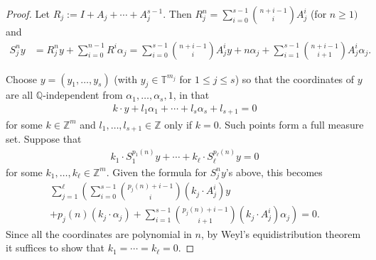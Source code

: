 \documentclass[10pt,a4paper]{amsart}
\newcommand{\Q}{{\mathbb Q}}
\newcommand{\T}{{\mathbb T}}
\newcommand{\Z}{{\mathbb Z}}
\newcommand{\brac}[1]{\mathopen{}\left( #1 \mathclose{}\right)}
\begin{document}
\begin{proof}
    Let $R_j:=I+ A_j + \cdots + A_j^{s-1}$. Then $R_j^n=\sum_{i=0}^{s-1}\binom{n+i-1}{i}A_j^i$ (for $n\geq 1)$ and 
    \begin{align*}
        S_j^n y &= R_j^n y + \sum_{i=0}^{n-1}R^i\alpha_j %
        = \sum_{i=0}^{s-1}\binom{n+i-1}{i}A_j^iy + n\alpha_j + \sum_{i=1}^{s-1}\binom{n+i-1}{i+1}A_j^i\alpha_j.
    \end{align*}
    

    Choose $y=(y_1, \ldots, y_s)$ (with $y_{j}\in\T^{m_{j}}$ for $1\leq j\leq s$) so that the coordinates of $y$ are all $\Q$-independent from $\alpha_1, \ldots, \alpha_s, 1$, in that
    \begin{align*}
        k\cdot y + l_1 \alpha_1 + \cdots + l_s \alpha_s + l_{s+1} = 0
    \end{align*}
    for some $k\in\Z^m$ and $l_1, \ldots, l_{s+1}\in\Z$ only if $k = 0$.
    Such points form a full measure set. Suppose that
    \begin{align*}%
        k_1\cdot S_1^{p_1(n)}y + \cdots + k_\ell \cdot S_\ell^{p_\ell(n)}y = 0
    \end{align*}
    for some $k_1, \ldots, k_\ell\in\Z^m$. Given the formula for $S_j^n y$'s above, this becomes
    \begin{multline}\label{E: linear combo 2}
        \sum_{j=1}^\ell \left(\sum_{i=0}^{s-1}\binom{p_j(n)+i-1}{i}(k_j\cdot A_j^i)y\right.\\
        \left.+ p_j(n)(k_j\cdot\alpha_j) + \sum_{i=1}^{s-1}\binom{p_j(n)+i-1}{i+1}(k_j\cdot A_j^i)\alpha_j\right) = 0.
    \end{multline}
    Since all the coordinates are polynomial in $n$, by Weyl's equidistribution theorem it suffices to show that $k_1 = \cdots = k_\ell = 0$.


\end{proof}
\end{document}
